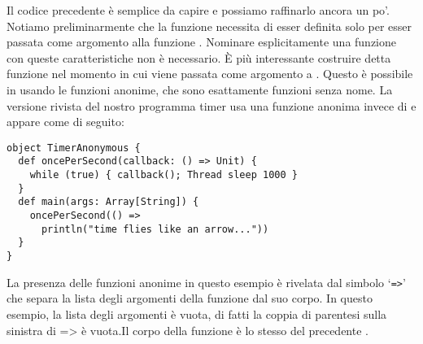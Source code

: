 Il codice precedente \`e semplice da capire e possiamo raffinarlo ancora un po'. Notiamo preliminarmente che la funzione  necessita di esser definita solo per esser passata come argomento alla funzione . Nominare esplicitamente una funzione con queste caratteristiche non \`e necessario. \`E pi\`u interessante costruire detta funzione nel momento in cui viene passata come argomento a . Questo \`e possibile in \Scala usando le funzioni anonime, che sono esattamente funzioni senza nome. La versione rivista del nostro programma timer usa una funzione anonima invece di  e appare come di seguito:
\begin{lstlisting}
object TimerAnonymous {
  def oncePerSecond(callback: () => Unit) {
    while (true) { callback(); Thread sleep 1000 }
  }
  def main(args: Array[String]) {
    oncePerSecond(() =>
      println("time flies like an arrow..."))
  }
}
\end{lstlisting}
La presenza delle funzioni anonime in questo esempio \`e rivelata dal simbolo `\verb|=>|' che separa la lista degli argomenti della funzione dal suo corpo. In questo esempio, la lista degli argomenti \`e vuota, di fatti la coppia di parentesi sulla sinistra di => \`e vuota.Il corpo della funzione \`e lo stesso del precedente .